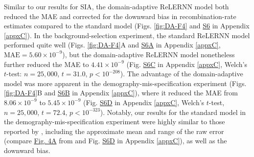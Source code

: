Similar to our results for \ac{SIA}, the domain-adaptive ReLERNN model both reduced the \ac{MAE} and corrected for the downward bias in recombination-rate estimates compared to the standard model (Figs. \ref{fig:DA-F4} and \href{https://journals.plos.org/plosgenetics/article?id=10.1371/journal.pgen.1011032#sec018}{S6} in Appendix \ref{appxC}). In the background-selection experiment, the standard ReLERNN model performed quite well (Figs. \ref{fig:DA-F4}A and \href{https://journals.plos.org/plosgenetics/article?id=10.1371/journal.pgen.1011032#sec018}{S6A} in Appendix \ref{appxC}, $\mathrm{MAE} = 5.60\times 10^{-9}$), but the domain-adaptive ReLERNN model nonetheless further reduced the MAE to $4.41\times 10^{-9}$ (Fig. \href{https://journals.plos.org/plosgenetics/article?id=10.1371/journal.pgen.1011032#sec018}{S6C} in Appendix \ref{appxC}, Welch’s $t$-test: $n = 25,000$, $t =31.0$, $p<10^{-208}$). The advantage of the domain-adaptive model was more apparent in the demography-mis-specification experiment (Figs. \ref{fig:DA-F4}B and \href{https://journals.plos.org/plosgenetics/article?id=10.1371/journal.pgen.1011032#sec018}{S6B} in Appendix \ref{appxC}), where it reduced the MAE from $8.06\times 10^{-9}$ to $5.45\times 10^{-9}$ (Fig. \href{https://journals.plos.org/plosgenetics/article?id=10.1371/journal.pgen.1011032#sec018}{S6D} in Appendix \ref{appxC}, Welch’s $t$-test, $n = 25,000$, $t = 72.4$, $p<10^{-323}$). Notably, our results for the standard model in the demography-mis-specification experiment were highly similar to those reported by \cite{adrion_predicting_2020}, including the approximate mean and range of the raw error (compare \href{https://academic.oup.com/view-large/figure/204168641/msaa038f4.tif}{Fig. 4A} from \cite{adrion_predicting_2020} and Fig. \href{https://journals.plos.org/plosgenetics/article?id=10.1371/journal.pgen.1011032#sec018}{S6D} in Appendix \ref{appxC}), as well as the downward bias.

